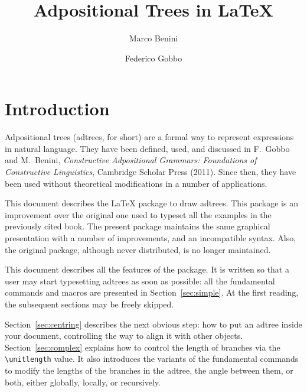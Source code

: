 \documentclass{amsart}
\begin{document}
\title{Adpositional Trees in \LaTeX}
\date{}
\author[Marco Benini]{Marco Benini}
\address[Marco Benini]{Dipartimento di Scienza e Alta Tecnologia\\ 
  Universit\`a degli Studi dell'Insubria\\
  via Valleggio 11, I-22100 Como, Italy}
\author[Federico Gobbo]{Federico Gobbo}
\address[Federico Gobbo]{Faculty of Humanities\\
  University of Amsterdam\\ 
  Spuistraat 210,NL-1012VT Amsterdam, The Netherlands}
\maketitle

\section{Introduction}\label{sec:introduction}
Adpositional trees (adtrees, for short) are a formal way to represent
expressions in natural language. They have been defined, used, and
discussed in F.~Gobbo and M.~Benini, \textit{Constructive Adpositional
  Grammars: Foundations of Constructive Linguistics}, Cambridge
Scholar Press (2011). Since then, they have been used without
theoretical modifications in a number of applications.

This document describes the \LaTeX\/ package to draw adtrees. This
package is an improvement over the original one used to typeset all
the examples in the previously cited book. The present package
maintains the same graphical presentation with a number of
improvements, and an incompatible syntax. Also, the original package,
although never distributed, is no longer maintained.

This document describes all the features of the package. It is written
so that a user may start typesetting adtrees as soon as possible: all
the fundamental commands and macros are presented in
Section~\ref{sec:simple}. At the first reading, the subsequent
sections may be freely skipped.

Section~\ref{sec:centring} describes the next obvious step: how to put
an adtree inside your document, controlling the way to align it with
other objects. Section~\ref{sec:complex} explains how to control the
length of branches via the \verb|\unitlength| value. It also
introduces the variants of the fundamental commands to modify the
lengths of the branches in the adtree, the angle between them, or
both, either globally, locally, or recursively.
\end{document}
